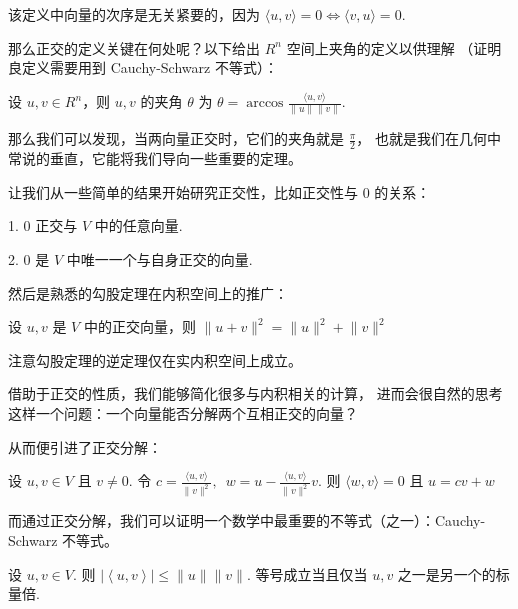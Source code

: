 该定义中向量的次序是无关紧要的，因为 $\langle u, v\rangle = 0 \Leftrightarrow \langle v, u\rangle = 0$. 

\vspace{2ex} 

那么正交的定义关键在何处呢？以下给出 $R^{n}$ 空间上夹角的定义以供理解
（证明良定义需要用到 Cauchy-Schwarz 不等式）：

\begin{definition}
    设 $u, v \in R^{n}$，则 $u, v$ 的夹角 $ \theta $ 为 
    $ \theta = \arccos \frac{\langle u, v\rangle}{\lVert u \rVert \lVert v \rVert}$.
\end{definition}

那么我们可以发现，当两向量正交时，它们的夹角就是 $\frac{\pi}{2}$，
也就是我们在几何中常说的垂直，它能将我们导向一些重要的定理。

\vspace{2ex} 

让我们从一些简单的结果开始研究正交性，比如正交性与 0 的关系：

1. 0 正交与 $V$ 中的任意向量.

2. 0 是 $V$ 中唯一一个与自身正交的向量.

然后是熟悉的勾股定理在内积空间上的推广：

\begin{theorem}
    设 $u, v$ 是 $V$ 中的正交向量，则 $\lVert u + v \rVert^2 = \lVert u \rVert^2 + \lVert v \rVert^2 $ 
\end{theorem}

注意勾股定理的逆定理仅在实内积空间上成立。

\vspace{2ex} 

借助于正交的性质，我们能够简化很多与内积相关的计算，
进而会很自然的思考这样一个问题：一个向量能否分解两个互相正交的向量？

从而便引进了正交分解：

\begin{theorem}
    设 $u, v \in V$ 且 $v \neq 0$. 令 $ c = \frac{\langle u, v\rangle}{\lVert v \rVert^2}, 
    \enspace w = u - \frac{\langle u, v\rangle}{\lVert v \rVert^2}v$. 则 $\langle w, v\rangle = 0$ 
    且 $u = cv + w$
\end{theorem}

而通过正交分解，我们可以证明一个数学中最重要的不等式（之一）：Cauchy-Schwarz 不等式。

\begin{theorem}
    设 $u, v \in V$. 则 $\left\lvert \left\langle u, v\right\rangle \right\rvert \leqslant \lVert u \rVert\lVert v \rVert$. 
    等号成立当且仅当 $u, v$ 之一是另一个的标量倍.
\end{theorem}

